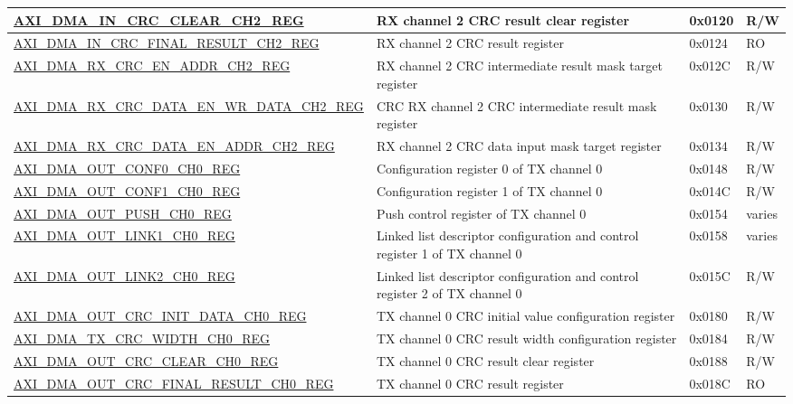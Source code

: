 \begin{longtable}{ | l | p{10cm} | p{1.3cm} | l | }
\hyperref[regdesc:AXIDMAINCRCCLEARCHNREG]{AXI\_DMA\_IN\_CRC\_CLEAR\_CH2\_REG} & RX channel 2 CRC result clear register & 0x0120 & R/W \\ \hline
\hyperref[regdesc:AXIDMAINCRCFINALRESULTCHNREG]{AXI\_DMA\_IN\_CRC\_FINAL\_RESULT\_CH2\_REG} & RX channel 2 CRC result register & 0x0124 & RO \\ \hline
\hyperref[regdesc:AXIDMARXCRCENADDRCHNREG]{AXI\_DMA\_RX\_CRC\_EN\_ADDR\_CH2\_REG} & RX channel 2 CRC intermediate result mask target register & 0x012C & R/W \\ \hline
\hyperref[regdesc:AXIDMARXCRCDATAENWRDATACHNREG]{AXI\_DMA\_RX\_CRC\_DATA\_EN\_WR\_DATA\_CH2\_REG} & CRC RX channel 2 CRC intermediate result mask register & 0x0130 & R/W \\ \hline
\hyperref[regdesc:AXIDMARXCRCDATAENADDRCHNREG]{AXI\_DMA\_RX\_CRC\_DATA\_EN\_ADDR\_CH2\_REG} & RX channel 2 CRC data input mask target register & 0x0134 & R/W \\ \hline
\hyperref[regdesc:AXIDMAOUTCONF0CHNREG]{AXI\_DMA\_OUT\_CONF0\_CH0\_REG} & Configuration register 0 of TX channel 0 & 0x0148 & R/W \\ \hline
\hyperref[regdesc:AXIDMAOUTCONF1CHNREG]{AXI\_DMA\_OUT\_CONF1\_CH0\_REG} & Configuration register 1 of TX channel 0 & 0x014C & R/W \\ \hline
\hyperref[regdesc:AXIDMAOUTPUSHCHNREG]{AXI\_DMA\_OUT\_PUSH\_CH0\_REG} & Push control register of TX channel 0 & 0x0154 & varies \\ \hline
\hyperref[regdesc:AXIDMAOUTLINK1CHNREG]{AXI\_DMA\_OUT\_LINK1\_CH0\_REG} & Linked list descriptor configuration and control register 1 of TX channel 0 & 0x0158 & varies \\ \hline
\hyperref[regdesc:AXIDMAOUTLINK2CHNREG]{AXI\_DMA\_OUT\_LINK2\_CH0\_REG} & Linked list descriptor configuration and control register 2 of TX channel 0 & 0x015C & R/W \\ \hline
\hyperref[regdesc:AXIDMAOUTCRCINITDATACHNREG]{AXI\_DMA\_OUT\_CRC\_INIT\_DATA\_CH0\_REG} & TX channel 0 CRC initial value configuration register & 0x0180 & R/W \\ \hline
\hyperref[regdesc:AXIDMATXCRCWIDTHCHNREG]{AXI\_DMA\_TX\_CRC\_WIDTH\_CH0\_REG} & TX channel 0 CRC result width configuration register & 0x0184 & R/W \\ \hline
\hyperref[regdesc:AXIDMAOUTCRCCLEARCHNREG]{AXI\_DMA\_OUT\_CRC\_CLEAR\_CH0\_REG} & TX channel 0 CRC result clear register & 0x0188 & R/W \\ \hline
\hyperref[regdesc:AXIDMAOUTCRCFINALRESULTCHNREG]{AXI\_DMA\_OUT\_CRC\_FINAL\_RESULT\_CH0\_REG} & TX channel 0 CRC result register & 0x018C & RO \\ \hline

\end{longtable}

